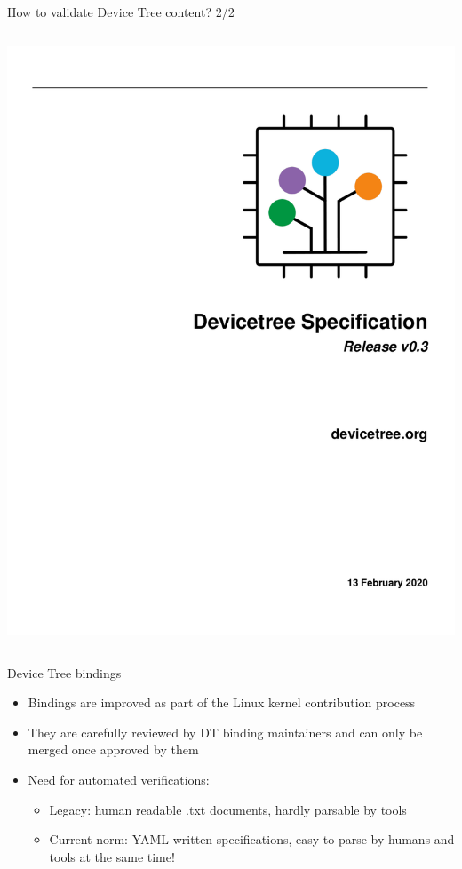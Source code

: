 \begin{frame}[fragile]{How to validate Device Tree content? 2/2}
\begin{columns}
    \includegraphics[width=\textwidth]{slides/kernel-hw-devices/dt-spec.png}
  \end{columns}
\end{frame}

\begin{frame}{Device Tree bindings}
  \begin{itemize}
      \item Bindings are improved as part of the Linux kernel
        contribution process
      \item They are carefully reviewed by DT binding maintainers and
        can only be merged once approved by them
      \item Need for automated verifications:
        \begin{itemize}
        \item Legacy: human readable .txt documents, hardly parsable
          by tools
        \item Current norm: YAML-written specifications, easy to parse
          by humans and tools at the same time!
        \end{itemize}
    \end{itemize}
\end{frame}

